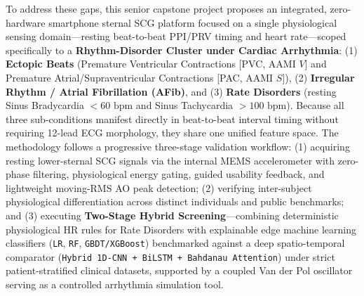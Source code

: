 To address these gaps, this senior capstone project proposes an integrated, zero-hardware smartphone sternal SCG platform focused on a single physiological sensing domain---resting beat-to-beat PPI/PRV timing and heart rate---scoped specifically to a \textbf{Rhythm-Disorder Cluster under Cardiac Arrhythmia}: (1) \textbf{Ectopic Beats} (Premature Ventricular Contractions [PVC, AAMI $V$] and Premature Atrial/Supraventricular Contractions [PAC, AAMI $S$]), (2) \textbf{Irregular Rhythm / Atrial Fibrillation (AFib)}, and (3) \textbf{Rate Disorders} (resting Sinus Bradycardia $<60\text{ bpm}$ and Sinus Tachycardia $>100\text{ bpm}$). Because all three sub-conditions manifest directly in beat-to-beat interval timing without requiring 12-lead ECG morphology, they share one unified feature space. The methodology follows a progressive three-stage validation workflow: (1) acquiring resting lower-sternal SCG signals via the internal MEMS accelerometer with zero-phase filtering, physiological energy gating, guided usability feedback, and lightweight moving-RMS AO peak detection; (2) verifying inter-subject physiological differentiation across distinct individuals and public benchmarks; and (3) executing \textbf{Two-Stage Hybrid Screening}---combining deterministic physiological HR rules for Rate Disorders with explainable edge machine learning classifiers (\texttt{LR}, \texttt{RF}, \texttt{GBDT/XGBoost}) benchmarked against a deep spatio-temporal comparator (\texttt{Hybrid 1D-CNN + BiLSTM + Bahdanau Attention}) under strict patient-stratified clinical datasets, supported by a coupled Van der Pol oscillator serving as a controlled arrhythmia simulation tool.

